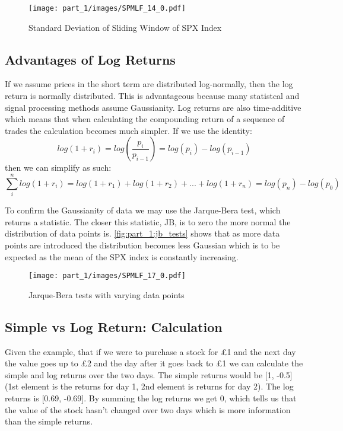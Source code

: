 \begin{figure}[!htb]
    \centering
    \texttt{[image: part\_1/images/SPMLF\_14\_0.pdf]}
    \caption{Standard Deviation of Sliding Window of SPX Index}
    \label{fig:part_1:sw_std_returns}
\end{figure}

\subsection{Advantages of Log Returns}

If we assume prices in the short term are distributed log-normally, then the log return is normally distributed. This is advantageous because many statistcal and signal processing methods assume Gaussianity. Log returns are also time-additive which means that when calculating the compounding return of a sequence of trades the calculation becomes much simpler. If we use the identity:
\[ log(1+r_i) = log(\frac{p_i}{p_{i-1}})  = log(p_i) - log(p_{i-1}) \] 
then we can simplify as such: 
\[\sum_{i}^{n} log(1+r_i) = log(1+r_1) + log(1+r_2) + ... + log(1+r_n) = log(p_n) - log(p_0)\]

To confirm the Gaussianity of data we may use the Jarque-Bera test, which returns a statistic. The closer this statistic, JB, is to zero the more normal the distribution of data points is. \autoref{fig:part_1:jb_tests} shows that as more data points are introduced the distribution becomes less Gaussian which is to be expected as the mean of the SPX index is constantly increasing.

\begin{figure}[!htb]
    \centering
    \texttt{[image: part\_1/images/SPMLF\_17\_0.pdf]}
    \caption{Jarque-Bera tests with varying data points}
    \label{fig:part_1:jb_tests}
\end{figure}


\subsection{Simple vs Log Return: Calculation}
Given the example, that if we were to purchase a stock for £1 and the next day the value goes up to £2 and the day after it goes back to £1 we can calculate the simple and log returns over the two days. The simple returns would be [1, -0.5] (1st element is the returns for day 1, 2nd element is returns for day 2). The log returns is [0.69, -0.69]. By summing the log returns we get 0, which tells us that the value of the stock hasn't changed over two days which is more information than the simple returns. 

